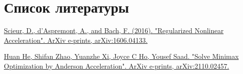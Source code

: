 \documentclass[12pt]{article}
\theoremstyle{definition}
\numberwithin{Def}{section}
\numberwithin{Th}{section}
\numberwithin{Prop}{section}
\numberwithin{St}{section}
\numberwithin{Cor}{section}
\begin{document}
\section{Список литературы}

\begin{enumerate}[{[}1{]}]
	\item \hyperlink{https://arxiv.org/abs/1606.04133}{Scieur, D., d’Aspremont, A., and Bach, F. (2016). "Regularized Nonlinear Acceleration". ArXiv e-prints, arXiv:1606.04133.}
	\item \hyperlink{https://arxiv.org/abs/2110.02457}{Huan He, Shifan Zhao, Yuanzhe Xi, Joyce C Ho, Yousef Saad. "Solve Minimax Optimization by Anderson Acceleration". ArXiv e-prints, arXiv:2110.02457.}

\end{enumerate}
\end{document}

